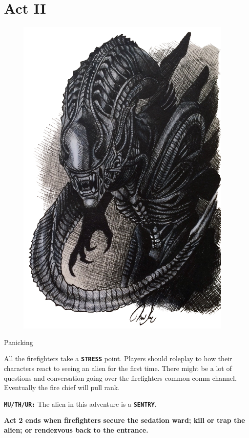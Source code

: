 \chapter{Act II}




\begin{figure}
   \centering
   \includegraphics[width=.45\textwidth]{img/bg/alien.png}
   \label{fig:refinery}
\end{figure}


\begin{rpg-commentbox}{Panicking}
   
   All the firefighters take a \texttt{\textbf{STRESS}} point. Players should roleplay to how their characters react to seeing an alien for the first time. There might be a lot of questions and conversation going over the firefighters common comm channel. Eventually the fire chief will pull rank.

   \texttt{\textbf{MU/TH/UR:}} The alien in this adventure is a \texttt{\textbf{SENTRY}}.

\end{rpg-commentbox}    


\begin{rpg-commentbox}{}
   \textbf{Act 2 ends when firefighters secure the sedation ward; kill or trap the alien; or rendezvous back to the entrance.}
\end{rpg-commentbox}

\newsect




